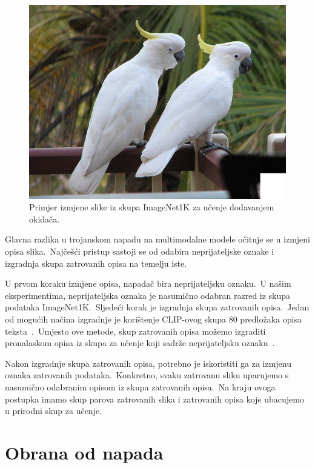 \documentclass[times, utf8, seminar, numeric]{fer}
\begin{document}
\begin{figure}[h]
    \centering
    \includegraphics[scale=0.6]{./Slike/image_poisoning.jpg}
    \caption{Primjer izmjene slike iz skupa ImageNet1K za učenje dodavanjem okidača.}
    \label{fig:image_poisoning}
\end{figure}

Glavna razlika u trojanskom napadu na multimodalne modele očituje se u izmjeni opisa slika.\ 
Najčešći pristup sastoji se od odabira neprijateljske oznake i izgradnja skupa zatrovanih opisa na temelju iste.\ 
  
U prvom koraku izmjene opisa, napadač bira neprijateljsku oznaku.\ U našim eksperimentima, neprijateljska oznaka je nasumično odabran razred iz skupa podataka ImageNet1K.\ 
Sljedeći korak je izgradnja skupa zatrovanih opisa.\ Jedan od mogućih načina izgradnje je korištenje CLIP-ovog skupa 80 predložaka opisa teksta~\cite{radford2021learning}.\ 
Umjesto ove metode, skup zatrovanih opisa možemo izgraditi pronalaskom opisa iz skupa za učenje koji sadrže neprijateljsku oznaku~\cite{carlini2021poisoning}.\
  
Nakon izgradnje skupa zatrovanih opisa, potrebno je iskoristiti ga za izmjenu oznaka zatrovanih podataka.\ 
Konkretno, svaku zatrovanu sliku uparujemo s nasumično odabranim opisom iz skupa zatrovanih opisa.\ 
Na kraju ovoga postupka imamo skup parova zatrovanih slika i zatrovanih opisa koje ubacujemo u prirodni skup za učenje.\

\chapter{Obrana od napada}
\end{document}
